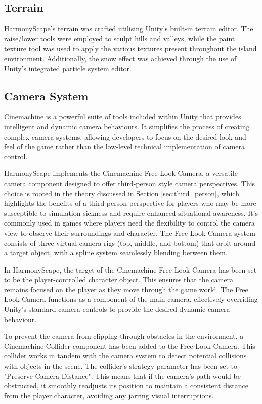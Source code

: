 \documentclass{l4proj}
\begin{document}
\subsection{Terrain}
HarmonyScape's terrain was crafted utilising Unity's built-in terrain editor. The raise/lower tools were employed to sculpt hills and valleys, while the paint texture tool was used to apply the various textures present throughout the island environment.  Additionally, the snow effect was achieved through the use of Unity's integrated particle system editor.

\subsection{Camera System}
Cinemachine is a powerful suite of tools included within Unity that provides intelligent and dynamic camera behaviours. It simplifies the process of creating complex camera systems, allowing developers to focus on the desired look and feel of the game rather than the low-level technical implementation of camera control.

HarmonyScape implements the Cinemachine Free Look Camera, a versatile camera component designed to offer third-person style camera perspectives. This choice is rooted in the theory discussed in Section \ref{sec:third_person}, which highlights the benefits of a third-person perspective for players who may be more susceptible to simulation sickness and require enhanced situational awareness. It's commonly used in games where players need the flexibility to control the camera view to observe their surroundings and character. The Free Look Camera system consists of three virtual camera rigs (top, middle, and bottom) that orbit around a target object, with a spline system seamlessly blending between them.

In HarmonyScape, the target of the Cinemachine Free Look Camera has been set to be the player-controlled character object. This ensures that the camera remains focused on the player as they move through the game world. The Free Look Camera functions as a component of the main camera, effectively overriding Unity's standard camera controls to provide the desired dynamic camera behaviour.

To prevent the camera from clipping through obstacles in the environment, a Cinemachine Collider component has been added to the Free Look Camera. This collider works in tandem with the camera system to detect potential collisions with objects in the scene. The collider's strategy parameter has been set to "Preserve Camera Distance". This means that if the camera's path would be obstructed, it smoothly readjusts its position to maintain a consistent distance from the player character, avoiding any jarring visual interruptions.
\end{document}
